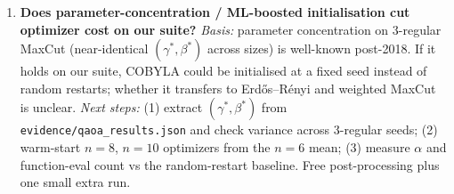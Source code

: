 \begin{enumerate}
\item \textbf{Does parameter-concentration / ML-boosted initialisation cut optimizer cost on our suite?}
\emph{Basis:} parameter concentration on 3-regular MaxCut (near-identical $(\gamma^\ast,\beta^\ast)$ across sizes) is well-known post-2018. If it holds on our suite, COBYLA could be initialised at a fixed seed instead of random restarts; whether it transfers to Erd\H{o}s--R\'enyi and weighted MaxCut is unclear.
\emph{Next steps:} (1) extract $(\gamma^\ast,\beta^\ast)$ from \texttt{evidence/qaoa\_results.json} and check variance across 3-regular seeds; (2) warm-start $n=8$, $n=10$ optimizers from the $n=6$ mean; (3) measure $\alpha$ and function-eval count vs the random-restart baseline. Free post-processing plus one small extra run.
\end{enumerate}
